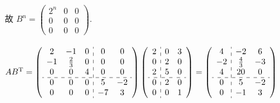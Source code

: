 		 故 $B^n = \begin{pmatrix}
				 2^n & 0 & 0 \\
				 0   & 0 & 0 \\
				 0   & 0 & 0
			 \end{pmatrix}$.


	 \paragraph{} %
		 $AB^{\mathrm{T}} = \left(\begin{array}{ccc:cc}
					 2  & -1          & 0 & 0  & 0  \\
					 -1 & \frac{2}{3} & 0 & 0  & 0  \\
					 0  & 0           & 4 & 0  & 0  \\ \hdashline
					 0  & 0           & 0 & 5  & -2 \\
					 0  & 0           & 0 & -7 & 3
				 \end{array}\right)
			 \left(\begin{array}{c:cc}
					 2 & 0 & 3 \\
					 0 & 2 & 0 \\
					 2 & 5 & 0 \\ \hdashline
					 0 & 2 & 0 \\
					 0 & 0 & 1
				 \end{array}\right) = \left(\begin{array}{c:cc}
					 4  & -2          & 6  \\
					 -2 & \frac{4}{3} & -3 \\
					 4  & 20          & 0  \\ \hdashline
					 0  & 5           & -2 \\
					 0  & -1          & 3
				 \end{array}\right)$


